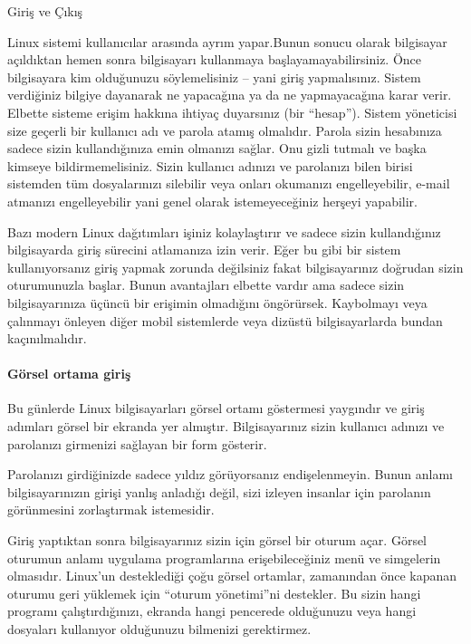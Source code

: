 \begin{section}{Giriş ve Çıkış}

Linux sistemi kullanıcılar arasında ayrım yapar.Bunun sonucu olarak bilgisayar açıldıktan hemen sonra bilgisayarı kullanmaya başlayamayabilirsiniz. Önce bilgisayara kim olduğunuzu söylemelisiniz – yani giriş yapmalısınız. Sistem verdiğiniz bilgiye dayanarak ne yapacağına ya da ne yapmayacağına karar verir. Elbette sisteme erişim hakkına ihtiyaç duyarsınız (bir “hesap”). Sistem yöneticisi size geçerli bir kullanıcı adı ve parola atamış olmalıdır. Parola sizin hesabınıza sadece sizin kullandığınıza emin olmanızı sağlar. Onu gizli tutmalı ve başka kimseye bildirmemelisiniz. Sizin kullanıcı adınızı ve parolanızı bilen birisi sistemden tüm dosyalarınızı silebilir veya onları okumanızı engelleyebilir, e-mail atmanızı engelleyebilir yani genel olarak istemeyeceğiniz herşeyi yapabilir. 

Bazı modern Linux dağıtımları işiniz kolaylaştırır ve sadece sizin kullandığınız bilgisayarda giriş sürecini atlamanıza izin verir. Eğer bu gibi bir sistem kullanıyorsanız giriş yapmak zorunda değilsiniz fakat bilgisayarınız doğrudan sizin oturumunuzla başlar. Bunun avantajları elbette vardır ama sadece sizin bilgisayarınıza üçüncü bir erişimin olmadığını öngörürsek. Kaybolmayı veya çalınmayı önleyen diğer mobil sistemlerde veya dizüstü bilgisayarlarda bundan kaçınılmalıdır. 

\paragraph{Görsel ortama giriş}{Bu günlerde Linux bilgisayarları görsel ortamı göstermesi yaygındır ve giriş adımları görsel bir ekranda yer almıştır. Bilgisayarınız sizin kullanıcı adınızı ve parolanızı girmenizi sağlayan bir form gösterir.}

Parolanızı girdiğinizde sadece yıldız görüyorsanız endişelenmeyin. Bunun anlamı bilgisayarınızın girişi yanlış anladığı değil, sizi izleyen insanlar için parolanın görünmesini zorlaştırmak istemesidir. 

Giriş yaptıktan sonra bilgisayarınız sizin için görsel bir oturum açar. Görsel oturumun anlamı uygulama programlarına erişebileceğiniz menü ve simgelerin olmasıdır. Linux’un desteklediği çoğu görsel ortamlar, zamanından önce kapanan oturumu geri yüklemek için “oturum yönetimi”ni destekler. Bu sizin hangi programı çalıştırdığınızı, ekranda hangi pencerede olduğunuzu veya hangi dosyaları kullanıyor olduğunuzu bilmenizi gerektirmez. 


\end{section}
